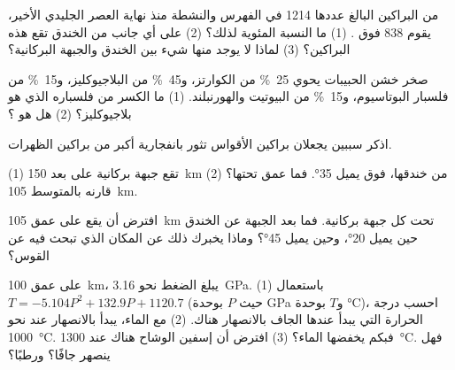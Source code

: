 \begin{exercise}[$\star$]\label{exo:g12:subduction-magmatism:3}
من البراكين البالغ عددها 1214 في الفهرس والنشطة منذ نهاية العصر الجليدي
الأخير، يقوم 838 فوق . (1) ما النسبة المئوية لذلك؟ (2) على
أي جانب من الخندق تقع هذه البراكين؟ (3) لماذا لا يوجد منها شيء بين
الخندق والجبهة البركانية؟
\end{exercise}

\begin{exercise}[$\star$]\label{exo:g12:subduction-magmatism:4}
صخر خشن الحبيبات يحوي \qty{25}{\percent} من الكوارتز، و\qty{45}{\percent} من
البلاجيوكليز، و\qty{15}{\percent} من فلسبار البوتاسيوم، و\qty{15}{\percent} من
البيوتيت والهورنبلند. (1) ما الكسر من فلسباره الذي هو بلاجيوكليز؟
(2) هل هو ؟
\end{exercise}

\begin{exercise}[$\star$]\label{exo:g12:subduction-magmatism:5}
اذكر سببين يجعلان براكين الأقواس تثور بانفجارية أكبر من براكين
الظهرات.
\end{exercise}

\begin{exercise}[$\star\star$]\label{exo:g12:subduction-magmatism:6}
(1) تقع جبهة بركانية على بعد \qty{150}{km} من خندقها، فوق 
يميل \ang{35}. فما عمق  تحتها؟ (2) قارنه
بالمتوسط \qty{105}{km}.
\end{exercise}

\begin{exercise}[$\star\star$]\label{exo:g12:subduction-magmatism:7}
افترض أن  يقع على عمق \qty{105}{km} تحت كل جبهة بركانية. فما بعد
الجبهة عن الخندق حين يميل  \ang{20}، وحين يميل
\ang{45}؟ وماذا يخبرك ذلك عن المكان الذي تبحث فيه عن القوس؟
\end{exercise}

\begin{exercise}[$\star\star$]\label{exo:g12:subduction-magmatism:8}
على عمق \qty{100}{km}، يبلغ الضغط نحو \qty{3.16}{GPa}. (1) باستعمال $T =
-5.104P^2 + 132.9P + 1120.7$ (حيث $P$ بوحدة \unit{GPa} و$T$ بوحدة \unit{\celsius})،
احسب درجة الحرارة التي يبدأ عندها  الجاف بالانصهار هناك.
(2) مع الماء، يبدأ بالانصهار عند نحو \qty{1000}{\celsius}. فبكم
يخفضها الماء؟ (3) افترض أن إسفين الوشاح هناك عند
\qty{1300}{\celsius}. فهل ينصهر جافًا؟ ورطبًا؟
\end{exercise}

